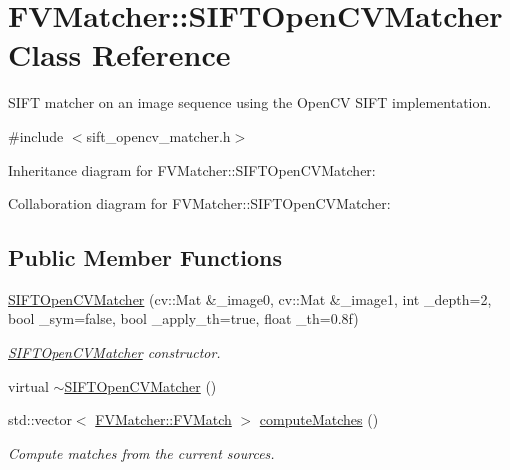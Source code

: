 \hypertarget{classFVMatcher_1_1SIFTOpenCVMatcher}{}\section{F\+V\+Matcher\+:\+:S\+I\+F\+T\+Open\+C\+V\+Matcher Class Reference}
\label{classFVMatcher_1_1SIFTOpenCVMatcher}


S\+I\+F\+T matcher on an image sequence using the Open\+C\+V S\+I\+F\+T implementation.  




{\ttfamily \#include $<$sift\+\_\+opencv\+\_\+matcher.\+h$>$}



Inheritance diagram for F\+V\+Matcher\+:\+:S\+I\+F\+T\+Open\+C\+V\+Matcher\+:


Collaboration diagram for F\+V\+Matcher\+:\+:S\+I\+F\+T\+Open\+C\+V\+Matcher\+:
\subsection*{Public Member Functions}
\begin{DoxyCompactItemize}
\item 
\hyperlink{classFVMatcher_1_1SIFTOpenCVMatcher_ae1681d531e472fef00c190091d86c33c}{S\+I\+F\+T\+Open\+C\+V\+Matcher} (cv\+::\+Mat \&\+\_\+image0, cv\+::\+Mat \&\+\_\+image1, int \+\_\+depth=2, bool \+\_\+sym=false, bool \+\_\+apply\+\_\+th=true, float \+\_\+th=0.\+8f)
\begin{DoxyCompactList}\small\item\em \hyperlink{classFVMatcher_1_1SIFTOpenCVMatcher}{S\+I\+F\+T\+Open\+C\+V\+Matcher} constructor. \end{DoxyCompactList}\item 
virtual \hyperlink{classFVMatcher_1_1SIFTOpenCVMatcher_ac81197e6ad0999995bcb59486208a1b7}{$\sim$\+S\+I\+F\+T\+Open\+C\+V\+Matcher} ()
\item 
std\+::vector$<$ \hyperlink{structFVMatcher_1_1FVMatch}{F\+V\+Matcher\+::\+F\+V\+Match} $>$ \hyperlink{classFVMatcher_1_1SIFTOpenCVMatcher_a28119e90b4d7b71867d604a7aa082e1b}{compute\+Matches} ()
\begin{DoxyCompactList}\small\item\em Compute matches from the current sources. \end{DoxyCompactList}\end{DoxyCompactItemize}


